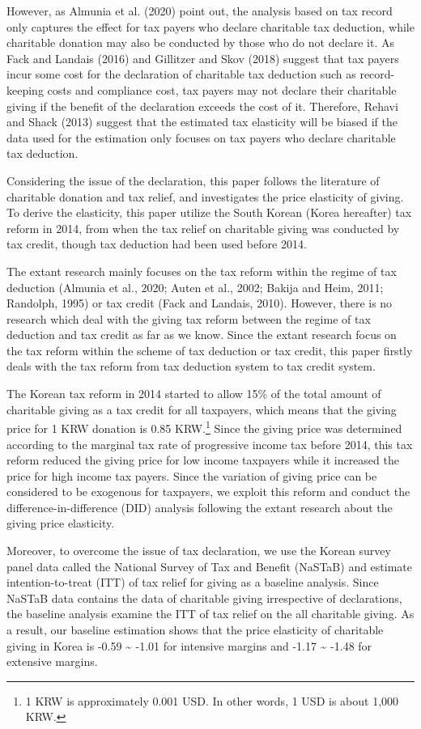 \documentclass[
  11pt,
  a4paper,
]{article}
\begin{document}
However, as Almunia et al. (2020) point out, the analysis based on tax record only captures the effect for tax payers who declare charitable tax deduction, while charitable donation may also be conducted by those who do not declare it. As Fack and Landais (2016) and Gillitzer and Skov (2018) suggest that tax payers incur some cost for the declaration of charitable tax deduction such as record-keeping costs and compliance cost, tax payers may not declare their charitable giving if the benefit of the declaration exceeds the cost of it. Therefore, Rehavi and Shack (2013) suggest that the estimated tax elasticity will be biased if the data used for the estimation only focuses on tax payers who declare charitable tax deduction.

Considering the issue of the declaration, this paper follows the literature of charitable donation and tax relief, and investigates the price elasticity of giving. To derive the elasticity, this paper utilize the South Korean (Korea hereafter) tax reform in 2014, from when the tax relief on charitable giving was conducted by tax credit, though tax deduction had been used before 2014.

The extant research mainly focuses on the tax reform within the regime of tax deduction (Almunia et al., 2020; Auten et al., 2002; Bakija and Heim, 2011; Randolph, 1995) or tax credit (Fack and Landais, 2010). However, there is no research which deal with the giving tax reform between the regime of tax deduction and tax credit as far as we know. Since the extant research focus on the tax reform within the scheme of tax deduction or tax credit, this paper firstly deals with the tax reform from tax deduction system to tax credit system.

The Korean tax reform in 2014 started to allow 15\% of the total amount of charitable giving as a tax credit for all taxpayers, which means that the giving price for 1 KRW donation is 0.85 KRW.\footnote{1 KRW is approximately 0.001 USD. In other words, 1 USD is about 1,000 KRW.} Since the giving price was determined according to the marginal tax rate of progressive income tax before 2014, this tax reform reduced the giving price for low income taxpayers while it increased the price for high income tax payers. Since the variation of giving price can be considered to be exogenous for taxpayers, we exploit this reform and conduct the difference-in-difference (DID) analysis following the extant research about the giving price elasticity.

Moreover, to overcome the issue of tax declaration, we use the Korean survey panel data called the National Survey of Tax and Benefit (NaSTaB) and estimate intention-to-treat (ITT) of tax relief for giving as a baseline analysis. Since NaSTaB data contains the data of charitable giving irrespective of declarations, the baseline analysis examine the ITT of tax relief on the all charitable giving.
As a result, our baseline estimation shows that the price elasticity of charitable giving in Korea is -0.59 \textasciitilde{} -1.01 for intensive margins and -1.17 \textasciitilde{} -1.48 for extensive margins.
\end{document}
